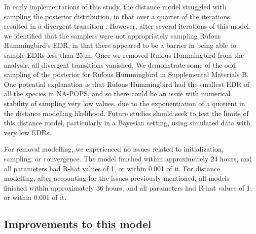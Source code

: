 \documentclass[12pt]{article}
\begin{document}
\par In early implementations of this study, the distance model struggled with sampling the posterior distribution, in that over a quarter of the iterations resulted in a divergent transition \citep{betancourt_diagnosing_2016, leimkuhler_simulating_2005}.
However, after several iterations of this model, we identified that the samplers were not appropriately sampling Rufous Hummingbird's EDR, in that there appeared to be a barrier in being able to sample EDRs less than 25 m. 
Once we removed Rufous Hummingbird from the analysis, all divergent transitions vanished.
We demonstrate some of the odd sampling of the posterior for Rufous Hummingbird in Supplemental Materials B.
One potential explanation is that Rufous Hummingbird had the smallest EDR of all the species in NA-POPS, and so there could be an issue with numerical stability of sampling very low values, due to the exponentiation of a quotient in the distance modelling likelihood.
Future studies should seek to test the limits of this distance model, particularly in a Bayesian setting, using simulated data with very low EDRs.

\par For removal modelling, we experienced no issues related to initialization, sampling, or convergence. 
The model finished within approximately 24 hours, and all parameters had R-hat values of 1, or within 0.001 of it. 
For distance modelling, after accounting for the issues previously mentioned, all models finished within approximately 36 hours, and all parameters had R-hat values of 1, or within 0.001 of it.

\subsection{Improvements to this model}
\end{document}
